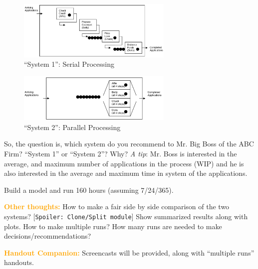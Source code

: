 \documentclass{article}
\begin{document}
\begin{figure}[htbp]
\begin{center}
	\includegraphics [width=0.66\textwidth] {SP.png}
\caption{``System 1'': Serial Processing}
\label{fig:sp}
\end{center}
\end{figure}

\begin{figure}[htbp]
\begin{center}
	\includegraphics [width=0.66\textwidth] {PP.png}
\caption{``System 2'': Parallel Processing}
\label{fig:pp}
\end{center}
\end{figure}

\vskip 0.3in

So, the question is, which system do you recommend to Mr. Big Boss of the ABC Firm? ``System 1'' or ``System 2''? Why? \textit{A tip}: Mr. Boss is interested in the average, and maximum number
of applications in the process (WIP) and he is also interested in the average and maximum time in system of the applications.  

\vskip 0.3in
Build a model and run 160 hours (assuming 7/24/365).

\vskip 0.3in
\textcolor{orange}{\bf Other thoughts:} How to make a fair side by side comparison of the two systems? [\texttt{Spoiler: Clone/Split module}] Show summarized results along with plots. How to make multiple runs? How many runs are needed to make decisions/recommendations? 
\vskip 0.3in

\textcolor{orange}{\bf Handout Companion:} Screencasts will be provided, along with ``multiple runs'' handouts.  
\end{document}

